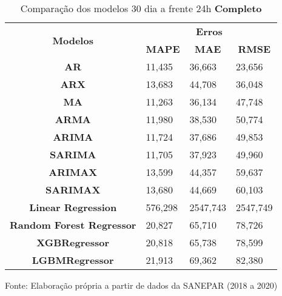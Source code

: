\begin{table}[H]
	\centering
	\caption{Comparação dos modelos 30 dia a frente 24h \textbf{Completo} }\label{tb:30-24cm}
	\begin{tabular}{@{}clll@{}}
		\toprule
		\multirow{2}{*}{\textbf{Modelos}} & \multicolumn{3}{c}{\textbf{Erros}}                                                                       \\ \cmidrule(l){2-4} 
		& \multicolumn{1}{c}{\textbf{MAPE}} & \multicolumn{1}{c}{\textbf{MAE}} & \multicolumn{1}{c}{\textbf{RMSE}} \\ \hline
\textbf{AR}                       & 11,435                            & 36,663                           & 23,656                            \\
\textbf{ARX}                      & 13,683                            & 44,708                           & 36,048                            \\
\textbf{MA}                       & 11,263                            & 36,134                           & 47,748                            \\
\textbf{ARMA}                     & 11,980                            & 38,530                           & 50,774                            \\
\textbf{ARIMA}                    & 11,724                            & 37,686                           & 49,853                            \\
\textbf{SARIMA}                   & 11,705                            & 37,923                           & 49,960                            \\
\textbf{ARIMAX}                   & 13,599                            & 44,357                           & 59,637                            \\
\textbf{SARIMAX}                  & 13,680                            & 44,669                           & 60,103                            \\
\textbf{Linear Regression}        & 576,298                           & 2547,743                         & 2547,749                          \\
\textbf{Random Forest Regressor}  & 20,827                            & 65,710                           & 78,726                            \\
\textbf{XGBRegressor}             & 20,818                            & 65,738                           & 78,599                            \\
\textbf{LGBMRegressor}            & 21,913                            & 69,362                           & 82,380                            \\ \bottomrule
	\end{tabular}

Fonte: Elaboração própria a partir de dados da SANEPAR (2018 a 2020)
\end{table}


